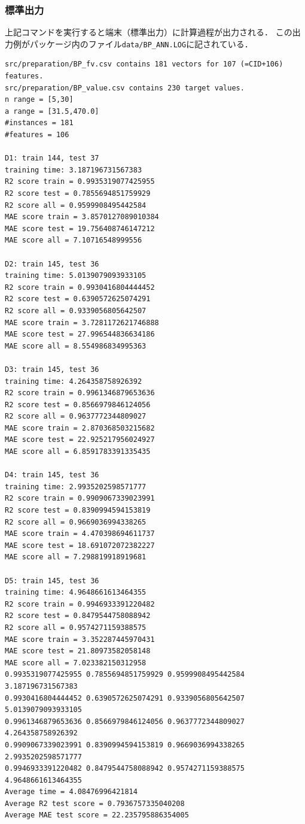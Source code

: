 \documentclass[11pt, titlepage, dvipdfmx, twoside]{jarticle}
\begin{document}
\subsubsection{標準出力}
上記コマンドを実行すると端末（標準出力）に計算過程が出力される．
この出力例がパッケージ内のファイル\verb|data/BP_ANN.LOG|に記されている．
\begin{oframed}
  {\small
\begin{verbatim}
src/preparation/BP_fv.csv contains 181 vectors for 107 (=CID+106) features.
src/preparation/BP_value.csv contains 230 target values.
n range = [5,30]
a range = [31.5,470.0]
#instances = 181
#features = 106

D1: train 144, test 37
training time: 3.187196731567383
R2 score train = 0.9935319077425955
R2 score test = 0.7855694851759929
R2 score all = 0.9599908495442584
MAE score train = 3.8570127089010384
MAE score test = 19.756408746147212
MAE score all = 7.10716548999556

D2: train 145, test 36
training time: 5.0139079093933105
R2 score train = 0.9930416804444452
R2 score test = 0.6390572625074291
R2 score all = 0.9339056805642507
MAE score train = 3.7281172621746888
MAE score test = 27.996544836634186
MAE score all = 8.554986834995363

D3: train 145, test 36
training time: 4.264358758926392
R2 score train = 0.9961346879653636
R2 score test = 0.8566979846124056
R2 score all = 0.9637772344809027
MAE score train = 2.870368503215682
MAE score test = 22.925217956024927
MAE score all = 6.8591783391335435

D4: train 145, test 36
training time: 2.9935202598571777
R2 score train = 0.9909067339023991
R2 score test = 0.8390994594153819
R2 score all = 0.9669036994338265
MAE score train = 4.470398694611737
MAE score test = 18.691072072382227
MAE score all = 7.298819918919681

D5: train 145, test 36
training time: 4.9648661613464355
R2 score train = 0.9946933391220482
R2 score test = 0.8479544758088942
R2 score all = 0.9574271159388575
MAE score train = 3.352287445970431
MAE score test = 21.80973582058148
MAE score all = 7.023382150312958
0.9935319077425955 0.7855694851759929 0.9599908495442584 3.187196731567383
0.9930416804444452 0.6390572625074291 0.9339056805642507 5.0139079093933105
0.9961346879653636 0.8566979846124056 0.9637772344809027 4.264358758926392
0.9909067339023991 0.8390994594153819 0.9669036994338265 2.9935202598571777
0.9946933391220482 0.8479544758088942 0.9574271159388575 4.9648661613464355
Average time = 4.08476996421814
Average R2 test score = 0.7936757335040208
Average MAE test score = 22.235795886354005
  \end{verbatim}        
}
\end{oframed}
\end{document}
